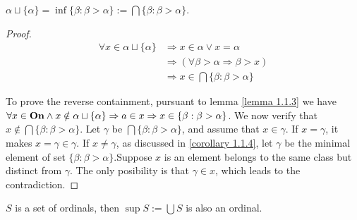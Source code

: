 \begin{corollary}
  $\alpha \sqcup \{ \alpha \} = \inf \{ \beta: \beta > \alpha \}:= \bigcap \{ \beta: \beta > \alpha \}$.
\end{corollary}
\begin{proof}
  \begin{align*}
    \forall x \in \alpha \sqcup \{ \alpha \} &\Rightarrow x \in \alpha \vee x = \alpha \\
    & \Rightarrow (\forall \beta > \alpha \Rightarrow \beta > x) \\
    & \Rightarrow x \in \bigcap \{ \beta: \beta > \alpha \}
  \end{align*}

  To prove the reverse containment, pursuant to lemma \ref{lemma 1.1.3} we have $\forall x \in \boldsymbol{\mathrm{On}} \wedge x \notin \alpha \sqcup \{ \alpha \} \Rightarrow a \in x \Rightarrow x \in \{\beta: \beta > \alpha \}$. We now verify that $x \notin \bigcap \{ \beta: \beta > \alpha \}$. Let $\gamma$ be $\bigcap \{ \beta: \beta > \alpha \}$, and assume that $x \in \gamma$. If $x = \gamma$, it makes $x = \gamma \in \gamma$. If $x \neq \gamma$, 
  as discussed in \ref{corollary 1.1.4}, let $\gamma$ be the minimal element of set $ \{ \beta: \beta > \alpha \}$.Suppose $x$ is an element belongs to the same class but distinct from $\gamma$. The only posibility is that $\gamma \in x$, which leads to the contradiction.


\end{proof}





\begin{corollary}
  $S$ is a set of ordinals, then $\sup S := \bigcup S$ is also an ordinal.
\end{corollary}


